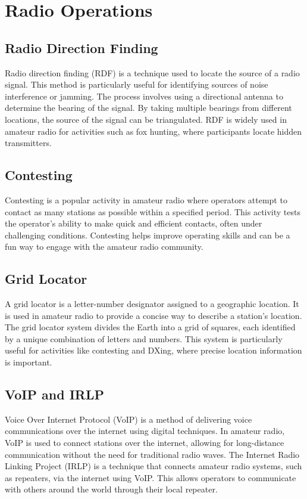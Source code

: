 \section{Radio Operations}
\label{section:radio_operations}

\subsection*{Radio Direction Finding}
Radio direction finding (RDF) is a technique used to locate the source of a radio signal. This method is particularly useful for identifying sources of noise interference or jamming. The process involves using a directional antenna to determine the bearing of the signal. By taking multiple bearings from different locations, the source of the signal can be triangulated. RDF is widely used in amateur radio for activities such as fox hunting, where participants locate hidden transmitters.

\subsection*{Contesting}
Contesting is a popular activity in amateur radio where operators attempt to contact as many stations as possible within a specified period. This activity tests the operator's ability to make quick and efficient contacts, often under challenging conditions. Contesting helps improve operating skills and can be a fun way to engage with the amateur radio community.

\subsection*{Grid Locator}
A grid locator is a letter-number designator assigned to a geographic location. It is used in amateur radio to provide a concise way to describe a station's location. The grid locator system divides the Earth into a grid of squares, each identified by a unique combination of letters and numbers. This system is particularly useful for activities like contesting and DXing, where precise location information is important.

\subsection*{VoIP and IRLP}
Voice Over Internet Protocol (VoIP) is a method of delivering voice communications over the internet using digital techniques. In amateur radio, VoIP is used to connect stations over the internet, allowing for long-distance communication without the need for traditional radio waves. The Internet Radio Linking Project (IRLP) is a technique that connects amateur radio systems, such as repeaters, via the internet using VoIP. This allows operators to communicate with others around the world through their local repeater.

